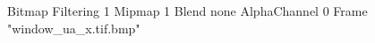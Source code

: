 {Bitmap
	{Filtering 1}
	{Mipmap 1}
	{Blend none}
	{AlphaChannel 0}
	{Frame "window_ua_x.tif.bmp"}
}
